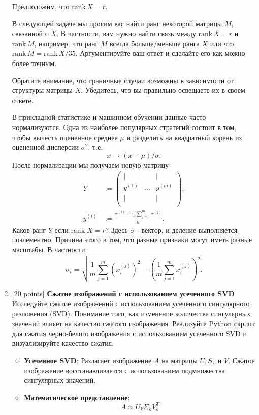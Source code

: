\documentclass[
  russian,
  letterpaper,
  DIV=11,
  numbers=noendperiod]{scrartcl}
\providecommand{\tightlist}{%
  \setlength{\itemsep}{0pt}\setlength{\parskip}{0pt}}
\begin{document}
\begin{enumerate}
  Предположим, что \(\text{rank}\,X = r\).

  В следующей задаче мы просим вас найти ранг некоторой матрицы \(M\),
  связанной с \(X\). В частности, вам нужно найти связь между
  \(\text{rank}\,X = r\) и \(\text{rank}\,M\), например, что ранг \(M\)
  всегда больше/меньше ранга \(X\) или что
  \(\text{rank}\,M = \text{rank}\,X \big / 35\). Аргументируйте ваш
  ответ и сделайте его как можно более точным.

  Обратите внимание, что граничные случаи возможны в зависимости от
  структуры матрицы \(X\). Убедитесь, что вы правильно освещаете их в
  своем ответе.

  В прикладной статистике и машинном обучении данные часто
  нормализуются. Одна из наиболее популярных стратегий состоит в том,
  чтобы вычесть оцененное среднее \(\mu\) и разделить на квадратный
  корень из оцененной дисперсии \(\sigma^2\). т.е. \[
   x \rightarrow (x - \mu) \big / \sigma.
   \] После нормализации мы получаем новую матрицу \[
   \begin{split}
   Y &:=
   \begin{pmatrix}
    | & & | \\
    y^{(1)} & \dots & y^{(m)} \\
    | & & | \\
   \end{pmatrix},\\
   y^{(i)} &:= \frac{x^{(i)} - \frac{1}{m}\sum_{j=1}^{m} x^{(j)}}{\sigma}.
   \end{split}
   \] Каков ранг \(Y\) если \(\text{rank} \; X = r\)? Здесь \(\sigma\) -
  вектор, и деление выполняется поэлементно. Причина этого в том, что
  разные признаки могут иметь разные масштабы. В частности: \[
   \sigma_i = \sqrt{\frac{1}{m}\sum_{j=1}^{m} \left(x_i^{(j)}\right)^2 - \left(\frac{1}{m}\sum_{j=1}^{m} x_i^{(j)}\right)^2}.
   \]
\item
  {[}20 points{]} \textbf{Сжатие изображений с использованием усеченного
  SVD} Исследуйте сжатие изображений с использованием усеченного
  сингулярного разложения (SVD). Понимание того, как изменение
  количества сингулярных значений влияет на качество сжатого
  изображения. Реализуйте Python скрипт для сжатия черно-белого
  изображения с использованием усеченного SVD и визуализируйте качество
  сжатия.

  \begin{itemize}
  \tightlist
  \item
    \textbf{Усеченное SVD}: Разлагает изображение \(A\) на матрицы
    \(U, S,\) и \(V\). Сжатое изображение восстанавливается с
    использованием подмножества сингулярных значений.
  \item
    \textbf{Математическое представление}: \[
      A \approx U_k \Sigma_k V_k^T
      \]


\end{itemize}
\end{enumerate}
\end{document}
